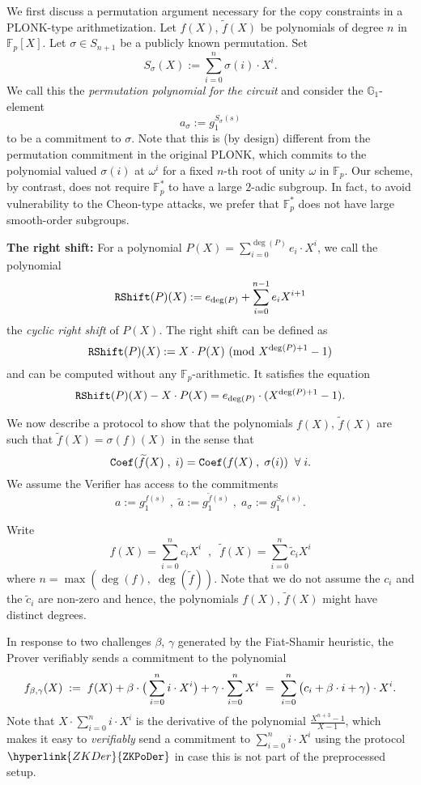 \documentclass[11pt, lettersize, notitlepage, leqno, footskip=0.6cm]{article}
\newcommand{\bFp}{\mathbb{F}_p}
\newcommand{\wti}{\widetilde}
\newcommand{\mb}{\mathbb}
\newcommand{\be}{\beta}
\newcommand{\vs}{\vspace{-0.15cm}}
\newcommand{\noin}{\noindent}
\newcommand{\Mod}[1]{\ (\mathrm{mod}\ #1)}
\numberwithin{equation}{section}
\begin{document}
We first discuss a permutation argument necessary for the copy constraints in a PLONK-type arithmetization. Let $f(X)$, $\wti{f}(X)$ be polynomials of degree $n$ in $\bFp[X]$. Let $\sigma\in S_{n+1}$ be a publicly known permutation. Set \vs $$ S_{\sigma}(X):= \sum\limits_{i=0}^n \sigma(i)\cdot X^i. $$ We call this the \textit{permutation polynomial for the circuit} and consider the $\mb{G}_1$-element \vs $$a_{\sigma}:= g_1^{S_{\sigma}(s)}$$ to be a commitment to $\sigma$. Note that this is (by design) different from the permutation commitment in the original PLONK, which commits to the polynomial valued $\sigma(i)$ at $\omega^i$ for a fixed $n$-th root of unity $\omega$ in $\bFp$. Our scheme, by contrast, does not require $\bFp^*$ to have a large $2$-adic subgroup. In fact, to avoid vulnerability to the Cheon-type attacks, we prefer that $\bFp^*$ does not have large smooth-order subgroups.\vspace{2mm}

\noin \textbf{The right shift:} For a polynomial $P(X) = \sum_{i=0}^{\deg(P)} e_i\cdot X^i$, we call the polynomial \vs $$ {\tt{RShift}}(P)(X)  := e_{\deg(P)} + \sum\limits_{i=0}^{n-1} e_{i} X^{i+1}  $$ the \textit{cyclic right shift} of $P(X)$. The right shift can be defined as \vs $$ {\tt{RShift}}(P)(X):= X\cdot P(X)\Mod{X^{\deg(P)+1}-1} $$ and can be computed without any $\bFp$-arithmetic. It satisfies the equation \vs $$ {\tt{RShift}}(P)(X) - X\cdot P(X) = e_{\deg(P)}\cdot (X^{\deg(P)+1}-1).  $$


We now describe a protocol to show that the polynomials $f(X)$, $\wti{f}(X)$ are such that $\wti{f}(X) = \sigma(f)(X)$ in the sense that \vs $$ {\tt{Coef}}(\wti{f}(X)\;,\;i) =  {\tt{Coef}}(f(X)\;,\;\sigma(i))\;\;\forall\;i.  $$ We assume the Verifier has access to the commitments $$a:= g_1^{f(s)}\;,\; \wti{a}:= g_1^{\wti{f}(s)}\;,\;a_{\sigma}:= g_1^{S_{\sigma}(s)}. $$




\noin Write \vs $$f(X) = \sum\limits_{i=0}^{n} c_i X^i\;\;,\;\; \wti{f}(X) = \sum\limits_{i=0}^{n} \wti{c}_i X^i$$ where $n = \max(\deg(f),\;\deg(\wti{f}))$. Note that we do not assume the $c_i$ and the $\wti{c}_i$ are non-zero and hence, the polynomials $f(X)$, $\wti{f}(X)$ might have distinct degrees. 

In response to two challenges $\be$, $\gamma$ generated by the Fiat-Shamir heuristic, the Prover verifiably sends a commitment to the polynomial \vs $$ f_{\be,\gamma}(X)\;:=\; f(X)+\be\cdot \big(\sum\limits_{i=0}^{n} i\cdot X^i\big)+\gamma\cdot \sum\limits_{i=0}^{n} X^i \;=\; \sum\limits_{i=0}^{n} \big(c_i+\be\cdot i + \gamma\big)\cdot X^i. \vs $$ Note that $X\cdot \sum_{i=0}^{n} i\cdot X^i$ is the derivative of the polynomial $\frac{X^{n+3}-1}{X-1}$, which makes it easy to \textit{verifiably} send a commitment to $\sum_{i=0}^{n} i\cdot X^i$ using the protocol $\hyperlink{ZKDer}{\tt{{ZKPoDer}}}$ in case this is not part of the preprocessed setup.
\end{document}
